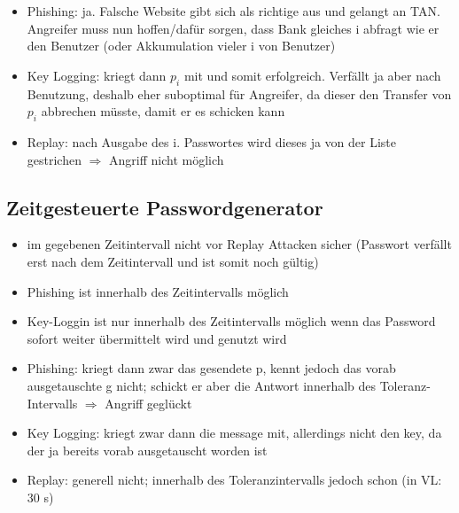 \documentclass{scrartcl}
\begin{document}
\begin{itemize}
  \item  Phishing: ja. Falsche Website gibt sich als richtige aus und gelangt an TAN. Angreifer muss nun hoffen/dafür
  sorgen, dass Bank gleiches i abfragt wie er den Benutzer (oder Akkumulation vieler i von Benutzer)
  \item Key Logging: kriegt dann $p_{i}$ mit und somit erfolgreich. Verfällt ja aber nach Benutzung, deshalb eher
  suboptimal für Angreifer, da dieser den Transfer von $p_{i}$  abbrechen müsste, damit er es schicken kann
  \item Replay: nach Ausgabe des i. Passwortes wird dieses ja von der Liste gestrichen $\Rightarrow$ Angriff nicht
  möglich
\end{itemize}

\subsection*{Zeitgesteuerte Passwordgenerator}
\begin{itemize}
  \item im gegebenen Zeitintervall nicht vor Replay Attacken sicher (Passwort
    verfällt erst nach dem Zeitintervall und ist somit noch gültig)
  \item Phishing ist innerhalb des Zeitintervalls möglich
  \item Key-Loggin ist nur innerhalb des Zeitintervalls möglich wenn das
    Password sofort weiter übermittelt wird und genutzt wird
\end{itemize}

\begin{itemize}
  \item  Phishing:  kriegt dann zwar das gesendete p, kennt jedoch das vorab ausgetauschte g nicht; schickt er aber
  die Antwort innerhalb des Toleranz-Intervalls $\Rightarrow$  Angriff geglückt
  \item Key Logging:  kriegt zwar dann die message mit, allerdings nicht den key, da der ja bereits vorab ausgetauscht
  worden ist
  \item Replay: generell nicht; innerhalb des Toleranzintervalls jedoch schon (in VL: 30 s)
\end{itemize}
\end{document}
